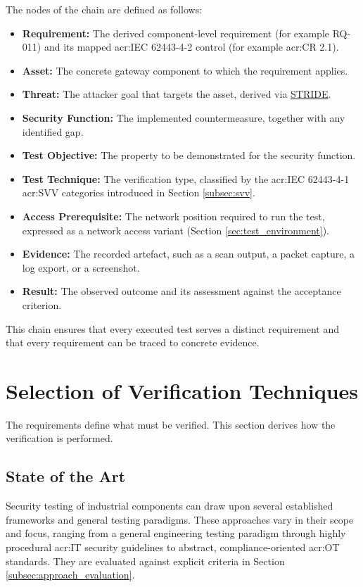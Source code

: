 The nodes of the chain are defined as follows: 
\begin{itemize} 
	\item \textbf{Requirement:} The derived component-level requirement (for example RQ-011) and its mapped \gls{acr:IEC} 62443-4-2 control (for example \gls{acr:CR} 2.1). 
	\item \textbf{Asset:} The concrete gateway component to which the requirement applies. 
	\item \textbf{Threat:} The attacker goal that targets the asset, derived via \hyperref[subsec:stride]{STRIDE}. 
	\item \textbf{Security Function:} The implemented countermeasure, together with any identified gap. 
	\item \textbf{Test Objective:} The property to be demonstrated for the security function. 
	\item \textbf{Test Technique:} The verification type, classified by the \gls{acr:IEC} 62443-4-1 \gls{acr:SVV} categories introduced in Section \ref{subsec:svv}. 
	\item \textbf{Access Prerequisite:} The network position required to run the test, expressed as a network access variant (Section \ref{sec:test_environment}). 
	\item \textbf{Evidence:} The recorded artefact, such as a scan output, a packet capture, a log export, or a screenshot. 
	\item \textbf{Result:} The observed outcome and its assessment against the acceptance criterion. 
\end{itemize} 

This chain ensures that every executed test serves a distinct requirement and that every requirement can be traced to concrete evidence.




\section{Selection of Verification Techniques} 
\label{sec:approach_selection} 

The requirements define what must be verified. This section derives how the verification is performed. 

\subsection{State of the Art}
\label{subsec:state_of_the_art_frameworks} 

Security testing of industrial components can draw upon several established frameworks and general testing paradigms. These approaches vary in their scope and focus, ranging from a general engineering testing paradigm through highly procedural \gls{acr:IT} security guidelines to abstract, compliance-oriented \gls{acr:OT} standards. They are evaluated against explicit criteria in Section \ref{subsec:approach_evaluation}. 

